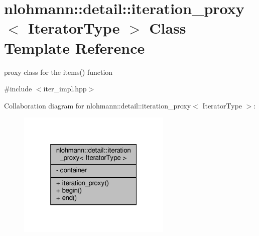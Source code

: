 \hypertarget{classnlohmann_1_1detail_1_1iteration__proxy}{}\section{nlohmann\+:\+:detail\+:\+:iteration\+\_\+proxy$<$ Iterator\+Type $>$ Class Template Reference}
\label{classnlohmann_1_1detail_1_1iteration__proxy}


proxy class for the items() function  




{\ttfamily \#include $<$iter\+\_\+impl.\+hpp$>$}



Collaboration diagram for nlohmann\+:\+:detail\+:\+:iteration\+\_\+proxy$<$ Iterator\+Type $>$\+:
\nopagebreak
\begin{figure}[H]
\begin{center}
\leavevmode
\includegraphics[width=208pt]{classnlohmann_1_1detail_1_1iteration__proxy__coll__graph}
\end{center}
\end{figure}
